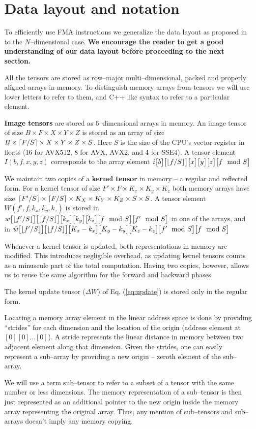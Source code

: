 \section{Data layout and notation}

  To efficiently use FMA instructions we generalize the data layout as
  proposed in~\cite{jeffers2016knl, cpu-myth} to the $N$--dimensional
  case.  {\bf We encourage the reader to get a good understanding of
    our data layout before proceeding to the next section.}

  All the tensors are stored as row--major multi--dimensional, packed
  and properly aligned arrays in memory.  To distinguish memory arrays
  from tensors we will use lower letters to refer to them, and C++
  like syntax to refer to a particular element.

  {\bf Image tensors} are stored as 6--dimensional arrays in memory.
  An image tensor of size $B \times F \times X \times Y \times Z$ is
  stored as an array of size $B \times \lceil F/S\rceil \times X \times Y
  \times Z \times S$.  Here $S$ is the size of the CPU's vector
  register in floats (16 for AVX512, 8 for AVX, AVX2, and 4 for SSE4).
  A tensor element $I(b,f,x,y,z)$ corresponds to the array element
  $i\big[b\big]\big[\lfloor f/S\rfloor\big]\big[x\big]\big[y\big]\big[z\big]\big[f\mod S\big]$

  We maintain two copies of a {\bf kernel tensor} in memory -- a
  regular and reflected form.  For a kernel tensor of size $F' \times
  F \times K_x \times K_y \times K_z$ both memory arrays have size
  $\lceil F'/S\rceil \times \lceil F/S\rceil \times K_X \times K_Y \times K_Z
  \times S \times S$.  A tensor element $W(f',f,k_x,k_y,k_z)$ is
  stored in $w\big[\lfloor f'/S\rfloor\big]
  \big[\lfloor f/S\rfloor\big]\big[k_x\big]\big[k_y\big]\big[k_z\big]\big[f\mod S\big]\big[f'
    \mod S\big]$ in one of the arrays, and in $\bar{w}\big[\lfloor f'/S\rfloor\big]
  \big[\lfloor f/S\rfloor\big]\big[K_x-k_x\big]\big[K_y-k_y\big]\big[K_z-k_z\big]\big[f'\mod
    S\big]\big[f\mod S\big]$

  Whenever a kernel tensor is updated, both representations in
  memory are modified.  This introduces negligible overhead, as
  updating kernel tensors counts as a minuscule part of the total
  computation.  Having two copies, however, allows us to reuse the
  same algorithm for the forward and backward phases.

  The kernel update tensor ($\Delta W$) of Eq. (\ref{eq:update}) is
  stored only in the regular form.

  Locating a memory array element in the linear address space is done
  by providing ``strides'' for each dimension and the location of the
  origin (address element at $[0][0]\dots[0]$).  A stride represents
  the linear distance in memory between two adjacent element along
  that dimension.  Given the strides, one can easily represent a
  sub--array by providing a new origin -- zeroth element of the
  sub--array.

  We will use a term sub--tensor to refer to a subset of a tensor with
  the same number or less dimensions.  The memory representation of a
  sub--tensor is then just represented as an additional pointer to the
  new origin inside the memory array representing the original array.
  Thus, any mention of sub--tensors and sub--arrays doesn't imply any
  memory copying.
